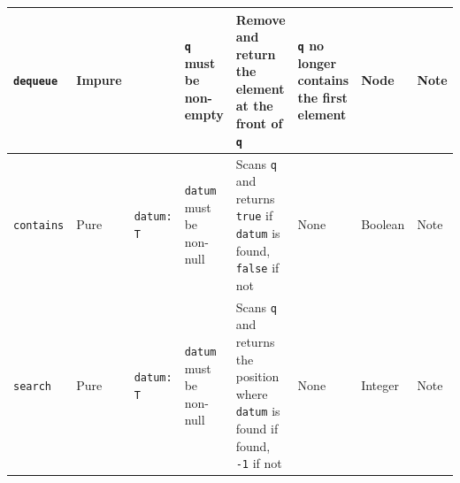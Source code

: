 \documentclass[10pt,letterpaper,final]{report}
\begin{document}
{\begin{center}
\begin{landscape}
\begin{xltabular}{\linewidth}{|l|l|X|X|X|X|X|X|}
          \verb|dequeue|   & Impure &                                   & \verb|q| must be non-empty                                    & Remove and return the element at the front of \verb|q|                                                                                                                                                                                                                                                                        & \verb|q| no longer contains the first element                                                                                                                & Node     & Note                                                                                                                                                            \\ \hline
          \verb|contains|  & Pure   & \verb|datum: T|                   & \verb|datum| must be non-null                                 & Scans \verb|q| and returns \verb|true| if \verb|datum| is found, \verb|false| if not                                                                                                                                                                                                                                          & None                                                                                                                                                         & Boolean  & Note                                                                                                                                                            \\ \hline
          \verb|search|    & Pure   & \verb|datum: T|                   & \verb|datum| must be non-null                                 & Scans \verb|q| and returns the position where \verb|datum| is found if found, \verb|-1| if not                                                                                                                                                                                                                                & None                                                                                                                                                         & Integer  & Note                                                                                                                                                            \\ \hline

\end{xltabular}
\end{landscape}
\end{center}}
\end{document}
